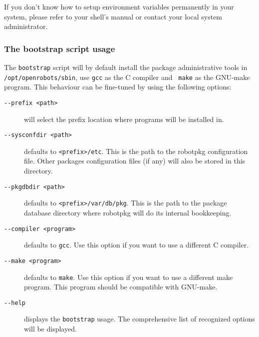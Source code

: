 If  you  don't know  how  to setup   environment variables  permanently in your
system,  please  refer  to  your shell's  manual  or contact  your local system
administrator.


\subsubsection{The bootstrap script usage} %

The {\tt bootstrap} script will by default install the package administrative
tools in {\tt /opt/openrobots/sbin}, use {\tt gcc} as the C compiler and {\tt
make} as the GNU-make program. This behaviour can be fine-tuned by using the
following options:

\begin{description}
   \item[\tt   -{}-prefix <path>]   will   select the  prefix  location where
   programs will be installed in.

   \item[\tt -{}-sysconfdir <path>] defaults to {\tt <prefix>/etc}. This is the
   path to the robotpkg configuration file.  Other packages configuration files
   (if any) will also be stored in this directory.

   \item[\tt -{}-pkgdbdir  <path>] defaults to {\tt  <prefix>/var/db/pkg}. This
   is the path  to the package database  directory  where robotpkg will  do its
   internal bookkeeping.

   \item[\tt -{}-compiler <program>] defaults to {\tt gcc}.  Use this option if
   you want to use a different C compiler.

   \item[\tt -{}-make <program>] defaults to {\tt make}. Use this option if you
   want to use a different make program. This program should be compatible with
   GNU-make.

   \item[\tt -{}-help]  displays  the {\tt bootstrap} usage.  The comprehensive
   list of recognized options will be displayed.
\end{description}

